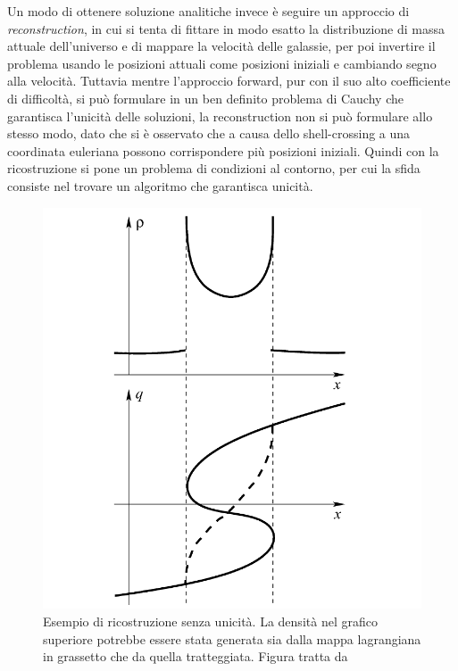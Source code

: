 Un modo di ottenere soluzione analitiche invece è seguire un approccio di \textit{reconstruction}, in cui
si tenta di fittare in modo esatto la distribuzione di massa attuale dell'universo e di mappare la velocità 
delle galassie, per poi invertire il problema usando le posizioni attuali come posizioni iniziali e 
cambiando segno alla velocità. 
Tuttavia mentre l'approccio forward, pur con il suo alto coefficiente di difficoltà, si può formulare
in un ben definito problema di Cauchy che garantisca l'unicità delle soluzioni, la reconstruction non
si può formulare allo stesso modo, dato che si è osservato che a causa dello shell-crossing a una 
coordinata euleriana possono corrispondere più posizioni iniziali. Quindi con la ricostruzione si pone 
un problema di condizioni al contorno, per cui la sfida consiste nel trovare un algoritmo che garantisca
unicità.

\begin{center}
	\begin{figure}[H]
		\centering
		\includegraphics[scale=0.5, angle=0]{rec.png}
        \caption{Esempio di ricostruzione senza unicità. La densità nel grafico superiore potrebbe essere stata generata
        sia dalla mappa lagrangiana in grassetto che da quella tratteggiata. Figura tratta da \cite{matarrese}}
		\label{fig:rec}
	\end{figure}
\end{center}


